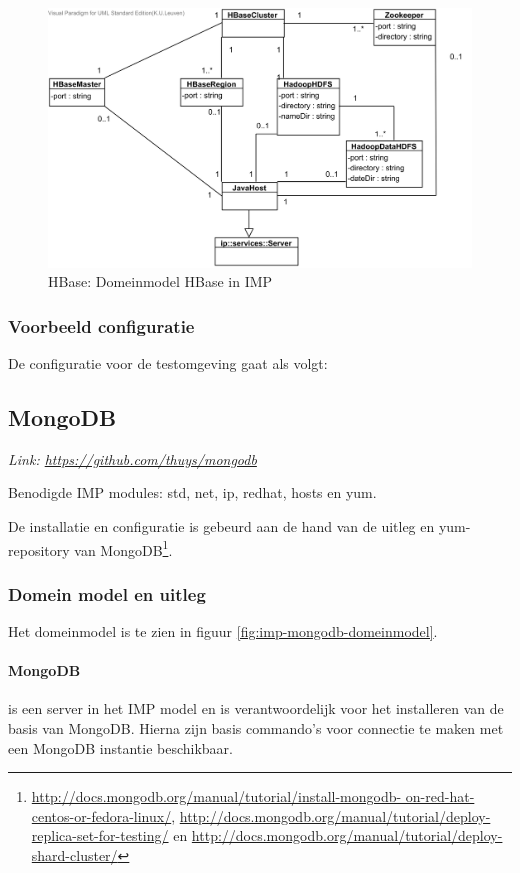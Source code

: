 \begin{figure}[ht!]
\centering
\includegraphics[width=\linewidth]{img/HBase-Domeinmodel.png}
\caption{HBase: Domeinmodel HBase in IMP}
\label{fig:imp-hbase-domeinmodel}
\end{figure}

\subsubsection{Voorbeeld configuratie}
De configuratie voor de testomgeving gaat als volgt: 




\subsection{MongoDB}
\textit{Link: \url{https://github.com/thuys/mongodb}}

Benodigde IMP modules: std, net, ip, redhat, hosts en yum. 

De installatie en configuratie is gebeurd aan de hand van de uitleg en yum-repository van MongoDB\footnote{\url {http://docs.mongodb.org/manual/tutorial/install-mongodb- on-red-hat-centos-or-fedora-linux/}, \url{http://docs.mongodb.org/manual/tutorial/deploy-replica-set-for-testing/} en  \url{http://docs.mongodb.org/manual/tutorial/deploy-shard-cluster/}}. 

\subsubsection{Domein model en uitleg}
Het domeinmodel is te zien in figuur \ref{fig:imp-mongodb-domeinmodel}.

	\paragraph{MongoDB} is een server in het IMP model en is verantwoordelijk voor het installeren van de basis van MongoDB. Hierna zijn basis commando's voor connectie te maken met een MongoDB instantie beschikbaar. 

